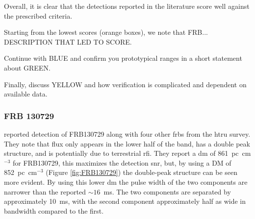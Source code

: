 \documentclass[a4paper,fleqn,usenatbib]{mnras}
\begin{document}
Overall, it is clear that the detections reported in the literature score well against the prescribed criteria.

Starting from the lowest scores (orange boxes), we note that FRB... DESCRIPTION THAT LED TO SCORE.

Continue with BLUE and confirm you prototypical ranges in a short statement about GREEN. 

Finally, discuss YELLOW and how verification is complicated and dependent on available data. 





















\subsubsection{FRB 130729}

\cite{2016MNRAS.460L..30C} reported detection of FRB130729 along with four other
\glspl{frb} from the \gls{htru} survey. They note that flux only appears in the
lower half of the band, has a double peak structure, and is potentially due to
terrestrial \gls{rfi}.  They report a \gls{dm} of 861~pc~cm$^{-3}$ for
FRB130729, this maximizes the detection \gls{snr}, but, by using a DM of
852~pc~cm$^{-3}$ (Figure \ref{fig:FRB130729}) the double-peak structure can be
seen more evident. By using this lower \gls{dm} the pulse width of the two
components are narrower than the reported $\sim 16$~ms.  The two components are
separated by approximately 10~ms, with the second component approximately half
as wide in bandwidth compared to the first.
\end{document}

